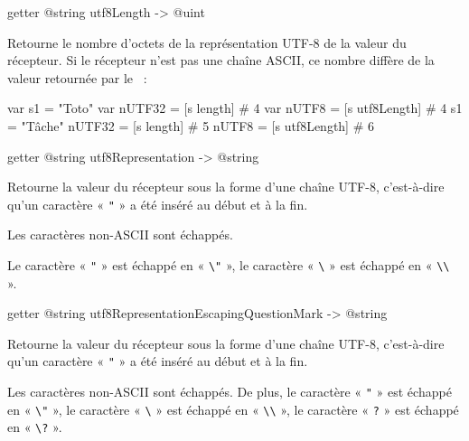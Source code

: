\begin{galgas3box}
getter @string utf8Length -> @uint
\end{galgas3box}

Retourne le nombre d'octets de la représentation UTF-8 de la valeur du récepteur. Si le récepteur n'est pas une chaîne ASCII, ce nombre diffère de la valeur retournée par le ~:

\begin{galgas3}
 var s1 = "Toto"
 var nUTF32 = [s length] # 4
 var nUTF8  = [s utf8Length] # 4
 s1 = "Tâche"
 nUTF32 = [s length] # 5
 nUTF8  = [s utf8Length] # 6
\end{galgas3}









\begin{galgas3box}
getter @string utf8Representation -> @string
\end{galgas3box}

Retourne la valeur du récepteur sous la forme d'une chaîne UTF-8, c'est-à-dire qu'un caractère « \texttt{"} » a été inséré au début et à la fin.

Les caractères non-ASCII sont échappés.

Le caractère « \texttt{"} » est échappé en « \texttt{\textbackslash"} », le caractère « \texttt{\textbackslash} » est échappé en « \texttt{\textbackslash\textbackslash} ».


















\begin{galgas3box}
getter @string utf8RepresentationEscapingQuestionMark -> @string
\end{galgas3box}

Retourne la valeur du récepteur sous la forme d'une chaîne UTF-8, c'est-à-dire qu'un caractère « \texttt{"} » a été inséré au début et à la fin.

Les caractères non-ASCII sont échappés. De plus, le caractère « \texttt{"} » est échappé en « \texttt{\textbackslash"} », le caractère « \texttt{\textbackslash} » est échappé en « \texttt{\textbackslash\textbackslash} », le caractère « \texttt{?} » est échappé en « \texttt{\textbackslash?} ».









